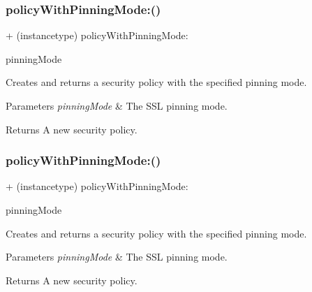 \subsubsection{\texorpdfstring{policy\+With\+Pinning\+Mode\+:()}{policyWithPinningMode:()}\hspace{0.1cm}{\footnotesize\ttfamily [2/3]}}
{\footnotesize\ttfamily + (instancetype) policy\+With\+Pinning\+Mode\+: \begin{DoxyParamCaption}\item[{(A\+F\+S\+S\+L\+Pinning\+Mode)}]{pinning\+Mode }\end{DoxyParamCaption}}

Creates and returns a security policy with the specified pinning mode.


\begin{DoxyParams}{Parameters}
{\em pinning\+Mode} & The S\+SL pinning mode.\\
\hline
\end{DoxyParams}
\begin{DoxyReturn}{Returns}
A new security policy. 
\end{DoxyReturn}
\mbox{\label{interface_a_f_security_policy_a94c44f7101fa4d0954d0c63f72f1e9cd}} 
\subsubsection{\texorpdfstring{policy\+With\+Pinning\+Mode\+:()}{policyWithPinningMode:()}\hspace{0.1cm}{\footnotesize\ttfamily [3/3]}}
{\footnotesize\ttfamily + (instancetype) policy\+With\+Pinning\+Mode\+: \begin{DoxyParamCaption}\item[{(A\+F\+S\+S\+L\+Pinning\+Mode)}]{pinning\+Mode }\end{DoxyParamCaption}}

Creates and returns a security policy with the specified pinning mode.


\begin{DoxyParams}{Parameters}
{\em pinning\+Mode} & The S\+SL pinning mode.\\
\hline
\end{DoxyParams}
\begin{DoxyReturn}{Returns}
A new security policy. 
\end{DoxyReturn}


